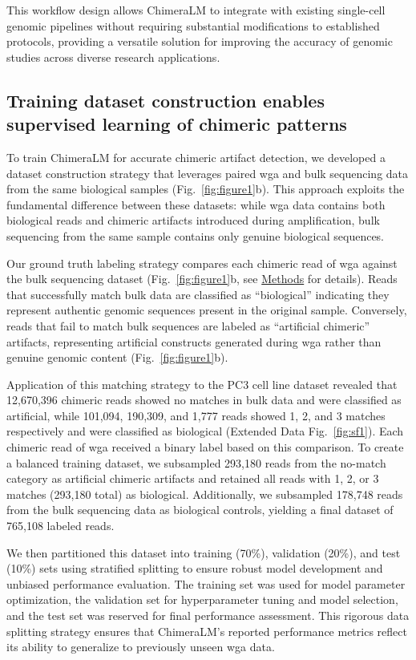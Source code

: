 \documentclass[pdflatex,sn-nature]{sn-jnl}%
\theoremstyle{thmstyleone}%
\theoremstyle{thmstyletwo}%
\theoremstyle{thmstylethree}%
\begin{document}
This workflow design allows ChimeraLM to integrate with existing single-cell genomic pipelines without requiring substantial modifications to established protocols, providing a versatile solution for improving the accuracy of genomic studies across diverse research applications.

\subsection*{Training dataset construction enables supervised learning of chimeric patterns}

To train ChimeraLM for accurate chimeric artifact detection, we developed a dataset construction strategy that leverages paired \gls{wga} and bulk sequencing data from the same biological samples (Fig.~\ref{fig:figure1}b).
This approach exploits the fundamental difference between these datasets: while \gls{wga} data contains both biological reads and chimeric artifacts introduced during amplification, bulk sequencing from the same sample contains only genuine biological sequences.

Our ground truth labeling strategy compares each chimeric read of \gls{wga} against the bulk sequencing dataset (Fig.~\ref{fig:figure1}b, see \hyperref[sec:methods]{Methods} for details).
Reads that successfully match bulk data are classified as ``biological'' indicating they represent authentic genomic sequences present in the original sample.
Conversely, reads that fail to match bulk sequences are labeled as ``artificial chimeric'' artifacts, representing artificial constructs generated during \gls{wga} rather than genuine genomic content (Fig.~\ref{fig:figure1}b).

Application of this matching strategy to the PC3 cell line dataset revealed that 12,670,396 chimeric reads showed no matches in bulk data and were classified as artificial, while 101,094, 190,309, and 1,777 reads showed 1, 2, and 3 matches respectively and were classified as biological (Extended Data Fig.~\ref{fig:sf1}).
Each chimeric read of \gls{wga} received a binary label based on this comparison.
To create a balanced training dataset, we subsampled 293,180 reads from the no-match category as artificial chimeric artifacts and retained all reads with 1, 2, or 3 matches (293,180 total) as biological.
Additionally, we subsampled 178,748 reads from the bulk sequencing data as biological controls, yielding a final dataset of 765,108 labeled reads.

We then partitioned this dataset into training (70\%), validation (20\%), and test (10\%) sets using stratified splitting to ensure robust model development and unbiased performance evaluation.
The training set was used for model parameter optimization, the validation set for hyperparameter tuning and model selection, and the test set was reserved for final performance assessment.
This rigorous data splitting strategy ensures that ChimeraLM's reported performance metrics reflect its ability to generalize to previously unseen \gls{wga} data.
\end{document}
